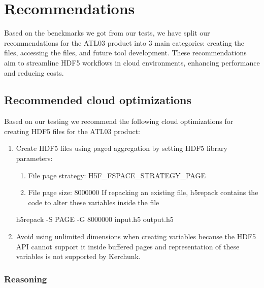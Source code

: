\documentclass[
]{agujournal2019}
\newenvironment{Shaded}{\begin{snugshade}}{\end{snugshade}}
\newcommand{\AttributeTok}[1]{\textcolor[rgb]{0.40,0.45,0.13}{#1}}
\newcommand{\ExtensionTok}[1]{\textcolor[rgb]{0.00,0.23,0.31}{#1}}
\newcommand{\NormalTok}[1]{\textcolor[rgb]{0.00,0.23,0.31}{#1}}
\providecommand{\tightlist}{%
  \setlength{\itemsep}{0pt}\setlength{\parskip}{0pt}}\usepackage{longtable,booktabs,array}
\begin{document}
\section{Recommendations}\label{recommendations}

Based on the benckmarks we got from our tests, we have split our
recommendations for the ATL03 product into 3 main categories: creating
the files, accessing the files, and future tool development. These
recommendations aim to streamline HDF5 workflows in cloud environments,
enhancing performance and reducing costs.

\subsection{Recommended cloud
optimizations}\label{recommended-cloud-optimizations}

Based on our testing we recommend the following cloud optimizations for
creating HDF5 files for the ATL03 product:

\begin{enumerate}
\def\labelenumi{\arabic{enumi}.}
\tightlist
\item
  Create HDF5 files using paged aggregation by setting HDF5 library
  parameters:

  \begin{enumerate}
  \def\labelenumii{\alph{enumii}.}
  \tightlist
  \item
    File page strategy: H5F\_FSPACE\_STRATEGY\_PAGE
  \item
    File page size: 8000000 If repacking an existing file, h5repack
    contains the code to alter these variables inside the file
  \end{enumerate}

\begin{Shaded}
\begin{Highlighting}[]
 \ExtensionTok{h5repack} \AttributeTok{{-}S}\NormalTok{ PAGE }\AttributeTok{{-}G}\NormalTok{ 8000000 input.h5 output.h5}
\end{Highlighting}
\end{Shaded}
\item
  Avoid using unlimited dimensions when creating variables because the
  HDF5 API cannot support it inside buffered pages and representation of
  these variables is not supported by Kerchunk.
\end{enumerate}

\subsubsection{Reasoning}\label{reasoning}
\end{document}
